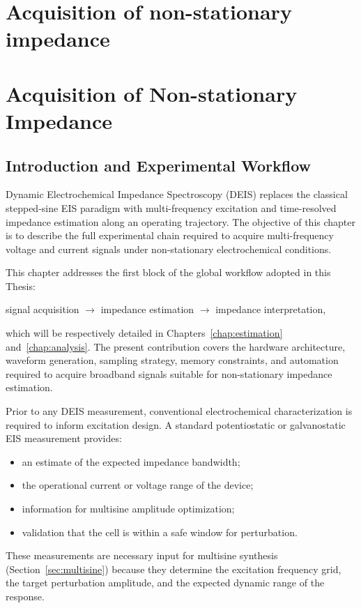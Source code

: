 \chapter{Acquisition of non-stationary impedance}
\label{ch:acquisition}

\chapter{Acquisition of Non-stationary Impedance}
\label{ch:acquisition}

\section{Introduction and Experimental Workflow}
\label{sec:intro-workflow}

Dynamic Electrochemical Impedance Spectroscopy (DEIS) replaces the classical stepped-sine EIS paradigm with multi-frequency excitation and time-resolved impedance estimation along an operating trajectory. The objective of this chapter is to describe the full experimental chain required to acquire multi-frequency voltage and current signals under non-stationary electrochemical conditions.

This chapter addresses the first block of the global workflow adopted in this Thesis:
\begin{center}
    signal acquisition $\rightarrow$ impedance estimation $\rightarrow$ impedance interpretation,
\end{center}
which will be respectively detailed in Chapters~\ref{chap:estimation} and~\ref{chap:analysis}. The present contribution covers the hardware architecture, waveform generation, sampling strategy, memory constraints, and automation required to acquire broadband signals suitable for non-stationary impedance estimation.

Prior to any DEIS measurement, conventional electrochemical characterization is required to inform excitation design. A standard potentiostatic or galvanostatic EIS measurement provides:
\begin{itemize}
    \item an estimate of the expected impedance bandwidth;
    \item the operational current or voltage range of the device;
    \item information for multisine amplitude optimization;
    \item validation that the cell is within a safe window for perturbation.
\end{itemize}
These measurements are necessary input for multisine synthesis (Section~\ref{sec:multisine}) because they determine the excitation frequency grid, the target perturbation amplitude, and the expected dynamic range of the response.

